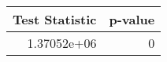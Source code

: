 \begin{tabular}{rr}
\toprule
   Test Statistic &   p-value \\
\midrule
      1.37052e+06 &         0 \\
\bottomrule
\end{tabular}